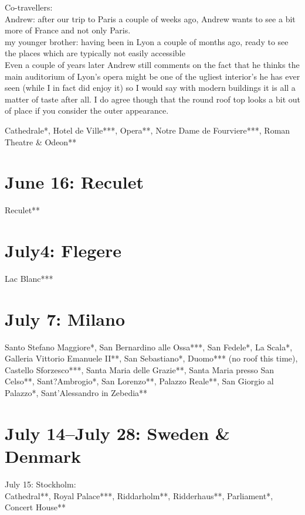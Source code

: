 Co-travellers:\\
Andrew: after our trip to Paris a couple of weeks ago, Andrew wants to see a bit more of France and not only Paris.\\

my younger brother: having been in Lyon a couple of months ago, ready to see the places which are typically not easily accessible\\

Even a couple of years later Andrew still comments on the fact that he thinks the main auditorium of Lyon's opera might be one of the ugliest interior's he has ever seen (while I in fact did enjoy it) so I would say with modern buildings it is all a matter of taste after all. I do agree though that the round roof top looks a bit out of place if you consider the outer appearance.

Cathedrale*, Hotel de Ville***, Opera**, Notre Dame de Fourviere***, Roman Theatre \& Odeon**\\

\section{June 16: Reculet}
\label{Reculet2013}

Reculet**

\section{July4: Flegere}
\label{Flegere2013}

Lac Blanc***

\section{July 7: Milano}
\label{Milano2013}

Santo Stefano Maggiore*, San Bernardino alle Ossa***, San Fedele*, La Scala*, Galleria Vittorio Emanuele II**, San Sebastiano*, Duomo*** (no roof this time), Castello Sforzesco***, Santa Maria delle Grazie**, Santa Maria presso San Celso**, Sant?Ambrogio*, San Lorenzo**, Palazzo Reale**, San Giorgio al Palazzo*, Sant'Alessandro in Zebedia**

\section{July 14--July 28: Sweden \& Denmark}
\label{2013:SwedenDenmark}

July 15: Stockholm:\\
Cathedral**, Royal Palace***, Riddarholm**, Ridderhaus**, Parliament*, Concert House**\\

